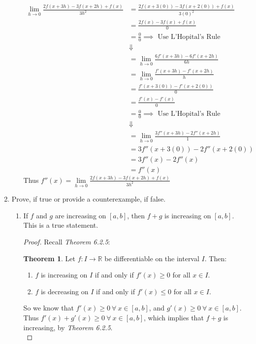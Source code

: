\documentclass[12pt,letterpaper]{article}
\newcommand{\R}{\mathbb{R}}
\theoremstyle{case}
\theoremstyle{definition}
\newtheorem{theorem*}{Theorem}
\begin{document}
\begin{enumerate}
\begin{enumerate}
			\begin{align*}
				\lim\limits_{h \to 0} \frac{2f(x+3h)-3f(x+2h)+f(x)}{3h^2} &= \frac{2f(x+3(0))-3f(x+2(0))+f(x)}{3(0)^2} \\
				&= \frac{2f(x)-3f(x)+f(x)}{0} \\
				&= \frac{0}{0} \implies \text{ Use L'Hopital's Rule} \\
				&\Downarrow \\
				&= \lim\limits_{h \to 0} \frac{6f'(x+3h)-6f'(x+2h)}{6h} \\
				&= \lim\limits_{h \to 0} \frac{f'(x+3h)-f'(x+2h)}{h} \\
				&= \frac{f'(x+3(0))-f'(x+2(0))}{0} \\
				&= \frac{f'(x)-f'(x)}{0} \\
				&= \frac{0}{0} \implies \text{ Use L'Hopital's Rule} \\
				&\Downarrow \\
				&= \lim\limits_{h \to 0} \frac{3f''(x+3h)-2f''(x+2h)}{1} \\
				&= 3f''(x+3(0))-2f''(x+2(0)) \\
				&= 3f''(x)-2f''(x) \\
				&= f''(x)
			\end{align*}
			Thus $f''(x)=\lim\limits_{h \to 0} \frac{2f(x+3h)-3f(x+2h)+f(x)}{3h^2}$
		\end{enumerate}
		\item Prove, if true or provide a counterexample, if false.
		\begin{enumerate}
			\item If $f$ and $g$ are increasing on $[a,b]$, then $f+g$ is increasing on $[a,b]$.\\
			
			This is a true statement.
			\begin{proof}
				Recall \textit{Theorem 6.2.5}:
				\begin{theorem*}
					Let $f:I \rightarrow \R$ be differentiable on the interval $I$. Then:
					\begin{enumerate}
						\item $f$ is increasing on $I$ if and only if $f'(x) \geq 0$ for all $x \in I$.
						\item $f$ is decreasing on $I$ if and only if $f'(x) \leq 0$ for all $x \in I$.
					\end{enumerate}
				\end{theorem*}
				So we know that $f'(x) \geq 0\ \forall\ x \in [a,b]$, and $g'(x) \geq 0\ \forall\ x \in [a,b]$. Thus $f'(x)+g'(x)\geq 0\ \forall\ x \in [a,b]$, which implies that $f+g$ is increasing, by \textit{Theorem 6.2.5}.\\
			\end{proof}
			

\end{enumerate}
\end{enumerate}
\end{document}
